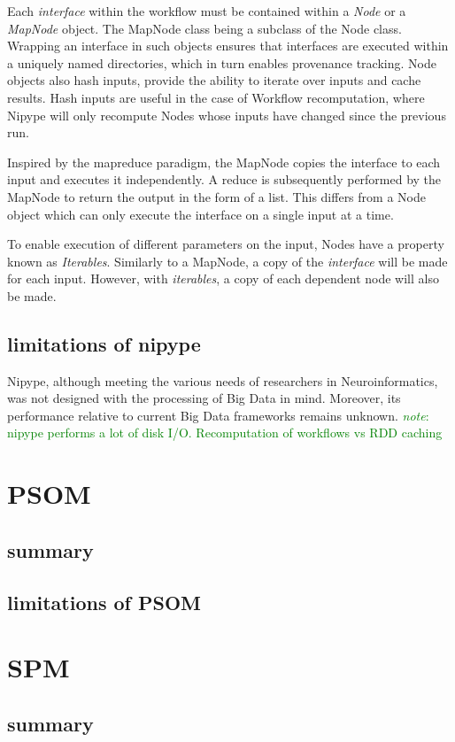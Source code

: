 \documentclass{report}
\newcommand{\note}[1]{\textcolor{green}{\textit{note}: #1}}
\begin{document}
		 Each \textit{interface} within the workflow must be contained within a \textit{Node} or a \textit{MapNode} object. The MapNode class being a subclass of the Node class. Wrapping an interface in such objects ensures that interfaces are executed within a uniquely named directories, which in turn enables provenance tracking. Node objects also hash inputs, provide the ability to iterate over inputs and cache results. Hash inputs are useful in the case of Workflow recomputation, where Nipype will only recompute Nodes whose inputs have changed since the previous run.
		
		Inspired by the mapreduce paradigm, the MapNode copies the interface to each input and executes it independently. A reduce is subsequently performed by the MapNode to return the output in the form of a list. This differs from a Node object which can only execute the interface on a single input at a time.
		
		To enable execution of different parameters on the input, Nodes have a property known as \textit{Iterables}. Similarly to a MapNode, a copy of the \textit{interface} will be made for each input. However, with \textit{iterables}, a copy of each dependent node will also be made.
		 
		\subsection{limitations of nipype}
		Nipype, although meeting the various needs of researchers in Neuroinformatics, was not designed with the processing of Big Data in mind. Moreover, its performance relative to current Big Data frameworks remains unknown.
		\note{nipype performs a lot of disk I/O. Recomputation of workflows vs RDD caching}
		
	\section{PSOM}
		\subsection{summary}
		\subsection{limitations of PSOM}
	\section{SPM}
		\subsection{summary}
\end{document}
